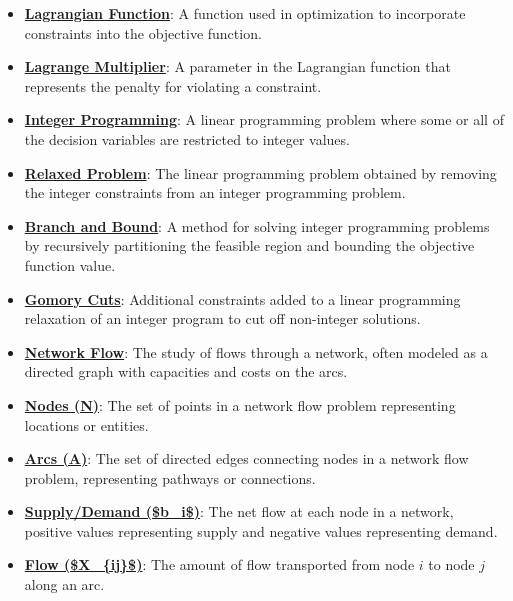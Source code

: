 \documentclass{article}%
\begin{document}
\begin{itemize}[leftmargin=*]
\item \href{https://www.math.purdue.edu/~yipn/421/2024-10-28-Farkas.pdf#page=4}{\textbf{Lagrangian Function}}: A function used in optimization to incorporate constraints into the objective function. %
\item \href{https://www.math.purdue.edu/~yipn/421/2024-10-28-Farkas.pdf#page=4}{\textbf{Lagrange Multiplier}}: A parameter in the Lagrangian function that represents the penalty for violating a constraint. %
\item \href{https://www.math.purdue.edu/~yipn/421/2024-10-31-IntLinProg.pdf#page=1}{\textbf{Integer Programming}}: A linear programming problem where some or all of the decision variables are restricted to integer values.%
\item \href{https://www.math.purdue.edu/~yipn/421/2024-10-31-IntLinProg.pdf#page=2}{\textbf{Relaxed Problem}}: The linear programming problem obtained by removing the integer constraints from an integer programming problem.%
\item \href{https://www.math.purdue.edu/~yipn/421/2024-10-31-IntLinProg.pdf#page=5}{\textbf{Branch and Bound}}: A method for solving integer programming problems by recursively partitioning the feasible region and bounding the objective function value.%
\item \href{https://www.math.purdue.edu/~yipn/421/2024-10-31-IntLinProg.pdf#page=15}{\textbf{Gomory Cuts}}: Additional constraints added to a linear programming relaxation of an integer program to cut off non-integer solutions.%
\item \href{https://www.math.purdue.edu/~yipn/421/2024-11-05-NetFlows.pdf#page=1}{\textbf{Network Flow}}: The study of flows through a network, often modeled as a directed graph with capacities and costs on the arcs. %
\item \href{https://www.math.purdue.edu/~yipn/421/2024-11-05-NetFlows.pdf#page=1}{\textbf{Nodes (N)}}: The set of points in a network flow problem representing locations or entities. %
\item \href{https://www.math.purdue.edu/~yipn/421/2024-11-05-NetFlows.pdf#page=1}{\textbf{Arcs (A)}}: The set of directed edges connecting nodes in a network flow problem, representing pathways or connections. %
\item \href{https://www.math.purdue.edu/~yipn/421/2024-11-05-NetFlows.pdf#page=2}{\textbf{Supply/Demand (\$b\_i\$)}}: The net flow at each node in a network, positive values representing supply and negative values representing demand. %
\item \href{https://www.math.purdue.edu/~yipn/421/2024-11-05-NetFlows.pdf#page=2}{\textbf{Flow (\$X\_\{ij\}\$)}}: The amount of flow transported from node $i$ to node $j$ along an arc. %

\end{itemize}
\end{document}
